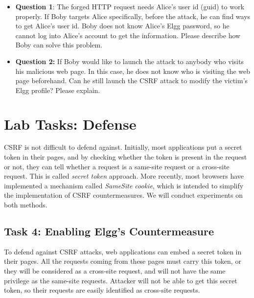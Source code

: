 \begin{itemize}
   \item \textbf{Question 1}: The forged HTTP request needs Alice's user
   id (guid) to work properly. If Boby targets Alice specifically, before
   the attack, he can find ways to get Alice's user id. Boby does not know 
   Alice's Elgg password, so he cannot log into Alice's account to get
   the information. Please describe how Boby can solve this problem.

   
   \item \textbf{Question 2:} If Boby would like to launch the attack to
   anybody who visits his malicious web page. In this case, he does not
   know who is visiting the web page beforehand. Can he still launch the CSRF attack
   to modify the victim's Elgg profile? Please explain.
\end{itemize}





\section{Lab Tasks: Defense} 

CSRF is not difficult to defend against. Initially, most applications
put a secret token in their pages, and by checking whether the token
is present in the request or not, they can tell whether a request
is a same-site request or a cross-site request. This is called
\textit{secret token} approach. 
More recently,
most browsers have implemented a mechanism called 
\textit{SameSite cookie}, which is intended to simplify the 
implementation of CSRF countermeasures. We will 
conduct experiments on both methods. 


\subsection{Task 4: Enabling Elgg's Countermeasure} 

To defend against CSRF attacks, web applications can embed a secret token
in their pages. All the requests coming from these pages must carry this 
token, or they will be considered as a cross-site request, and will
not have the same privilege as the same-site requests. 
Attacker will not be able to get this secret token, so their requests
are easily identified as cross-site requests. 


